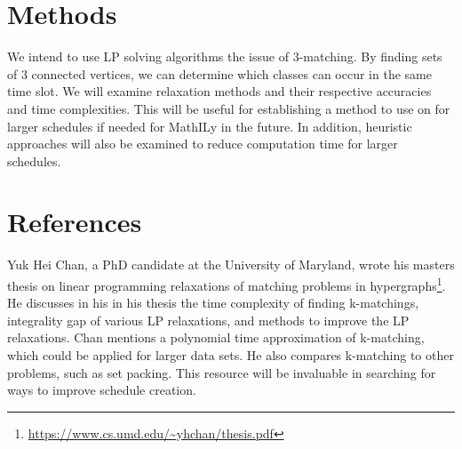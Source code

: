 \documentclass[11pt]{article}
\begin{document}
\section{Methods}

We intend to use LP solving algorithms the issue of 3-matching. By finding sets of 3 connected vertices, we can determine which classes can occur in the same time slot. We will examine relaxation methods and their respective accuracies and time complexities. This will be useful for establishing a method to use on for larger schedules if needed for MathILy in the future. In addition, heuristic approaches will also be examined to reduce computation time for larger schedules.


\section{References}
Yuk Hei Chan, a PhD candidate at the University of Maryland, wrote his masters thesis on linear programming relaxations of matching problems in hypergraphs\footnote{\url{https://www.cs.umd.edu/~yhchan/thesis.pdf}}. He discusses in his in his thesis the time complexity of finding k-matchings, integrality gap of various LP relaxations, and methods to improve the LP relaxations. Chan mentions a polynomial time approximation of k-matching, which could be applied for larger data sets. He also compares k-matching to other problems, such as set packing. This resource will be invaluable in searching for ways to improve schedule creation.
\end{document}

